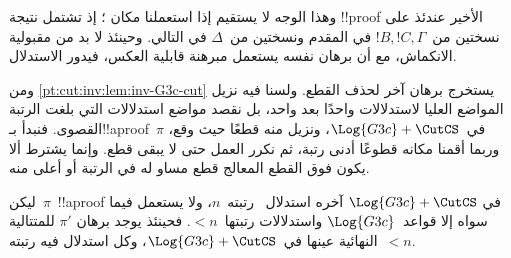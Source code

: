 \documentclass[../../../include/open-logic-section]{subfiles}
\begin{document}
وهذا الوجه لا يستقيم إذا استعملنا \Cut{} مكان \CutCS؛ إذ تشتمل نتيجة
!!{proof} الأخير عندئذ على نسختين من~$!B, !C, \Gamma$ في المقدم ونسختين
من~$\Delta$ في التالي. وحينئذ لا بد من مقبولية الانكماش، مع أن برهان
 نفسه يستعمل مبرهنة قابلية العكس، فيدور
الاستدلال.

ومن \cref{pt:cut:inv:lem:inv-G3c-cut} يستخرج برهان آخر لحذف القطع. ولسنا
فيه نزيل المواضع العليا لاستدلالات \CutCS{} واحدًا بعد واحد، بل نقصد
مواضع استدلالات \CutCS{} التي بلغت الرتبة القصوى. فنبدأ بـ!!a{proof}~$\pi$
في~$\Log{G3c} + \CutCS$، ونزيل منه قطعًا حيث وقع، وربما أقمنا مكانه قطوعًا
أدنى رتبة، ثم نكرر العمل حتى لا يبقى قطع. وإنما يشترط ألا يكون فوق القطع
المعالج قطع مساو له في الرتبة أو أعلى منه.

\begin{lem} ليكن~$\pi$~!!a{proof} في
$\Log{G3c}+\CutCS$ آخره استدلال~\CutCS{} رتبته~$n$، ولا يستعمل فيما سواه
إلا قواعد~$\Log{G3c}$ واستدلالات \CutCS{} رتبتها~$<n$. فحينئذ يوجد برهان
$\pi'$ للمتتالية النهائية عينها في~$\Log{G3c} + \CutCS$، وكل استدلال
\CutCS{} فيه رتبته~$<n$.
\end{lem}
\end{document}
